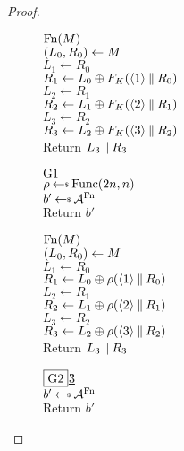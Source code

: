 \begin{proof}
\begin{figure}[t]
{\underline{$\textnormal{Fn}(M)$}\\
$(L_0, R_0) \gets M$\\
$L_1 \gets R_0$\\
$R_1 \gets L_0 \oplus F_K(\langle 1\rangle \: \| \: R_0)$\\
$L_2 \gets R_1$\\
$R_2 \gets L_1 \oplus F_K(\langle 2 \rangle \: \| \: R_1)$\\
$L_3 \gets R_2$\\
$R_3 \gets L_2 \oplus F_K(\langle 3 \rangle \: \| \: R_2)$\\
Return $L_3 \: \| \: R_3$
}{
\underline{${{\textnormal G}}1$}\\[2pt]
$\rho \getsr \Func(2n,n)$\\
$b' \getsr \advA^\Fn$\\
Return $b'$\medskip

\underline{$\textnormal{Fn}(M)$}\\
$(L_0, R_0) \gets M$\\
$L_1 \gets R_0$\\
$R_1 \gets L_0 \oplus \rho(\langle 1\rangle \: \| \: R_0)$\\
$L_2 \gets R_1$\\
$R_2 \gets L_1 \oplus \rho(\langle 2 \rangle \: \| \: R_1)$\\
$L_3 \gets R_2$\\
$R_3 \gets L_2 \oplus \rho(\langle 3 \rangle \: \| \: R_2)$\\
Return $L_3 \: \| \: R_3$
}{
\underline{$\fbox{{{\textnormal G}}2}$\;\;\;\G3}\\[2pt]
$b' \getsr \advA^\Fn$\\
Return $b'$\medskip

}
\end{figure}
\end{proof}
